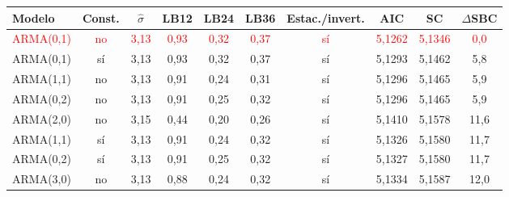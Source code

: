 \begin{tabular}{lccccccccc}
\toprule
Modelo & Const. & $\hat\sigma$ & LB12 & LB24 & LB36 & Estac./invert. & AIC & SC & $\Delta$SBC
\\ \midrule
\textcolor{red}{ARMA(0,1)} & \textcolor{red}{no} & \textcolor{red}{3{,}13} & \textcolor{red}{0{,}93} & \textcolor{red}{0{,}32} & \textcolor{red}{0{,}37} & \textcolor{red}{s\'i} & \textcolor{red}{5{,}1262} & \textcolor{red}{5{,}1346} & \textcolor{red}{0{,}0} \\
ARMA(0,1) & s\'i & 3{,}13 & 0{,}93 & 0{,}32 & 0{,}37 & s\'i & 5{,}1293 & 5{,}1462 & 5{,}8 \\
ARMA(1,1) & no & 3{,}13 & 0{,}91 & 0{,}24 & 0{,}31 & s\'i & 5{,}1296 & 5{,}1465 & 5{,}9 \\
ARMA(0,2) & no & 3{,}13 & 0{,}91 & 0{,}25 & 0{,}32 & s\'i & 5{,}1296 & 5{,}1465 & 5{,}9 \\
ARMA(2,0) & no & 3{,}15 & 0{,}44 & 0{,}20 & 0{,}26 & s\'i & 5{,}1410 & 5{,}1578 & 11{,}6 \\
ARMA(1,1) & s\'i & 3{,}13 & 0{,}91 & 0{,}24 & 0{,}32 & s\'i & 5{,}1326 & 5{,}1580 & 11{,}7 \\
ARMA(0,2) & s\'i & 3{,}13 & 0{,}91 & 0{,}25 & 0{,}32 & s\'i & 5{,}1327 & 5{,}1580 & 11{,}7 \\
ARMA(3,0) & no & 3{,}13 & 0{,}88 & 0{,}24 & 0{,}32 & s\'i & 5{,}1334 & 5{,}1587 & 12{,}0 \\
\bottomrule
\end{tabular}
